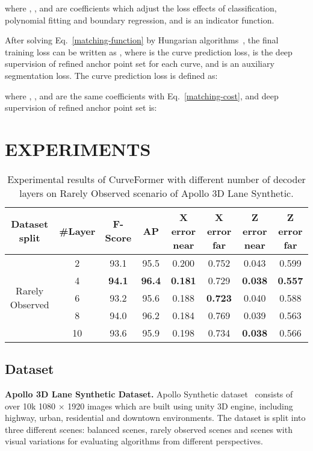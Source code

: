 \documentclass[letterpaper, 10 pt, conference]{ieeeconf}
\begin{document}
where , , and  are coefficients which adjust the loss effects of classification, polynomial fitting and boundary regression, and  is an indicator function. 

After solving Eq.~\ref{matching-function} by Hungarian algorithms~\cite{carion2020end}, the final training loss can be written as , where  is the curve prediction loss,  is the deep supervision of refined anchor point set for each curve, and  is an auxiliary segmentation loss.
The curve prediction loss is defined as:

where , , and  are the same coefficients with Eq.~\ref{matching-cost}, and deep supervision of refined anchor point set is:



\section{EXPERIMENTS}

\begin{table*}[t]
  \begin{center}
  \begin{scriptsize}
    \caption{Experimental results of CurveFormer with different number of decoder layers on Rarely Observed scenario of Apollo 3D Lane Synthetic.}
    \label{tab:decoder-layer}
    \begin{tabular}{c|c|cccccc}
    \toprule
      Dataset split & \#Layer & F-Score & AP & X error near & X error far & Z error near & Z error far \\
      \midrule
      \multicolumn{1}{c|}{\multirow{5}{5em}{Rarely Observed}}
      & 2 & 93.1 & 95.5 & 0.200 & 0.752 & 0.043 & 0.599 \\
      & 4 & \textbf{94.1} & \textbf{96.4} & \textbf{0.181} & 0.729 & \textbf{0.038} & \textbf{0.557} \\
      & 6 & 93.2 & 95.6 & 0.188 & \textbf{0.723} & 0.040 & 0.588 \\
      & 8 & 94.0 & 96.2 & 0.184 & 0.769 & 0.039 & 0.563 \\
      & 10 & 93.6 & 95.9 & 0.198 & 0.734 & \textbf{0.038} & 0.566 \\
      \bottomrule
    \end{tabular}
    \end{scriptsize}
  \end{center}
\end{table*}


\subsection{Dataset}
\textbf{Apollo 3D Lane Synthetic Dataset.} Apollo Synthetic dataset~\cite{guo2020gen} consists of over 10k 1080 × 1920 images which are built using unity 3D engine, including highway, urban, residential and downtown environments. 
The dataset is split into three different scenes: balanced scenes, rarely observed scenes and scenes with visual variations for evaluating algorithms from different perspectives.
\end{document}
